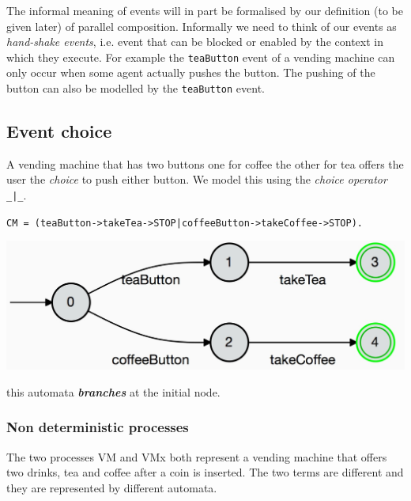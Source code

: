 \documentclass[]{article}
\begin{document}
 The informal meaning of events  will  in part be formalised  by our  definition (to be given later) of  parallel composition. Informally we need to think of our events as \emph{hand-shake events}, i.e. event that can be blocked or enabled by the context in which they execute. For example the \verb$teaButton$ event of a vending machine can only occur when some agent actually pushes the button.  The pushing of the button  can also be modelled  by the \verb$teaButton$ event.




\subsection{Event choice}
A vending machine that has two buttons one for coffee the other for tea offers the user the \emph{choice} to push either button. We model this using the \emph{choice operator} \verb$_|_$.



\noindent\begin{center}  \verb$CM = (teaButton->takeTea->STOP|coffeeButton->takeCoffee->STOP).$

\includegraphics[scale=0.15]{CM.jpg}\end{center}

\noindent this automata {\bf \it branches} at the  initial node.

\subsubsection{Non deterministic processes} \label{sec:ndfa}
The two processes {\sf VM}  and {\sf VMx} both represent a vending machine that offers two drinks, {\sf tea} and {\sf coffee} after a coin is inserted. The two  terms are different and they are represented by  different automata.
\end{document}
